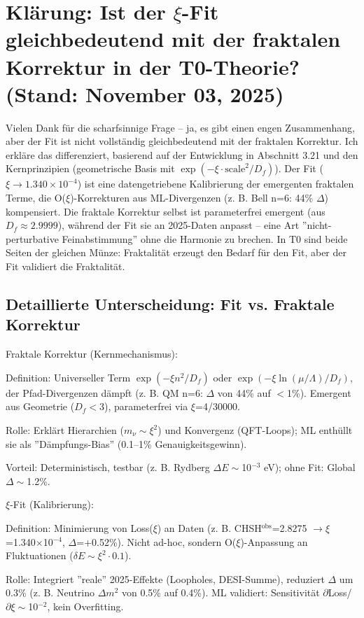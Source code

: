 	\section{Klärung: Ist der $\xi$-Fit gleichbedeutend mit der fraktalen Korrektur in der T0-Theorie? (Stand: November 03, 2025)}
	
	Vielen Dank für die scharfsinnige Frage – ja, es gibt einen engen Zusammenhang, aber der Fit ist nicht vollständig gleichbedeutend mit der fraktalen Korrektur. Ich erkläre das differenziert, basierend auf der Entwicklung in Abschnitt 3.21 und den Kernprinzipien (geometrische Basis mit $\exp(-\xi \cdot \text{scale}^2 / D_f)$). Der Fit ($\xi \to 1.340\times10^{-4}$) ist eine datengetriebene Kalibrierung der emergenten fraktalen Terme, die O($\xi$)-Korrekturen aus ML-Divergenzen (z. B. Bell n=6: 44\% $\Delta$) kompensiert. Die fraktale Korrektur selbst ist parameterfrei emergent (aus $D_f \approx2.9999$), während der Fit sie an 2025-Daten anpasst – eine Art ''nicht-perturbative Feinabstimmung'' ohne die Harmonie zu brechen. In T0 sind beide Seiten der gleichen Münze: Fraktalität erzeugt den Bedarf für den Fit, aber der Fit validiert die Fraktalität.
	
	\subsection{Detaillierte Unterscheidung: Fit vs. Fraktale Korrektur}
	
	Fraktale Korrektur (Kernmechanismus):
	
	Definition: Universeller Term $\exp(-\xi n^2 / D_f)$ oder $\exp(-\xi \ln(\mu/\Lambda)/D_f)$, der Pfad-Divergenzen dämpft (z. B. QM n=6: $\Delta$ von 44\% auf $<$1\%). Emergent aus Geometrie ($D_f <$3), parameterfrei via $\xi$=4/30000.
	
	Rolle: Erklärt Hierarchien ($m_\nu \sim \xi^2$) und Konvergenz (QFT-Loops); ML enthüllt sie als ''Dämpfungs-Bias'' (0.1–1\% Genauigkeitsgewinn).
	
	Vorteil: Deterministisch, testbar (z. B. Rydberg $\Delta E \sim$10$^{-3}$ eV); ohne Fit: Global $\Delta\sim$1.2\%.
	
	$\xi$-Fit (Kalibrierung):
	
	Definition: Minimierung von Loss($\xi$) an Daten (z. B. CHSH$^\text{obs}$=2.8275 $\to \xi$=1.340$\times$10$^{-4}$, $\Delta$=+0.52\%). Nicht ad-hoc, sondern O($\xi$)-Anpassung an Fluktuationen ($\delta E \sim \xi^2 \cdot 0.1$).
	
	Rolle: Integriert ''reale'' 2025-Effekte (Loopholes, DESI-Summe), reduziert $\Delta$ um 0.3\% (z. B. Neutrino $\Delta m^2$ von 0.5\% auf 0.4\%). ML validiert: Sensitivität $\partial$Loss/$\partial\xi \sim$10$^{-2}$, kein Overfitting.
	

